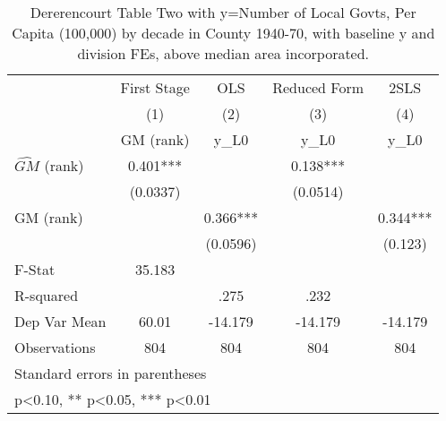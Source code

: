 \begin{table}[htbp]\centering
\def\sym#1{\ifmmode^{#1}\else\(^{#1}\)\fi}
\caption{Dererencourt Table Two with y=Number of Local Govts, Per Capita (100,000) by decade in County 1940-70, with baseline y and division FEs, above median area incorporated.}
\begin{tabular}{l*{4}{c}}
\toprule
                    & First Stage   &         OLS   &Reduced Form   &        2SLS   \\
                    &\multicolumn{1}{c}{(1)}&\multicolumn{1}{c}{(2)}&\multicolumn{1}{c}{(3)}&\multicolumn{1}{c}{(4)}\\
                    &\multicolumn{1}{c}{GM  (rank)}&\multicolumn{1}{c}{y\_L0}&\multicolumn{1}{c}{y\_L0}&\multicolumn{1}{c}{y\_L0}\\
\midrule
$\hat{GM}$ (rank)   &       0.401***&               &       0.138***&               \\
                    &    (0.0337)   &               &    (0.0514)   &               \\
\addlinespace
GM  (rank)          &               &       0.366***&               &       0.344***\\
                    &               &    (0.0596)   &               &     (0.123)   \\
\midrule
F-Stat              &      35.183   &               &               &               \\
R-squared           &               &        .275   &        .232   &               \\
Dep Var Mean        &       60.01   &     -14.179   &     -14.179   &     -14.179   \\
Observations        &         804   &         804   &         804   &         804   \\
\bottomrule
\multicolumn{5}{l}{\footnotesize Standard errors in parentheses}\\
\multicolumn{5}{l}{\footnotesize * p<0.10, ** p<0.05, *** p<0.01}\\
\end{tabular}
\end{table}
